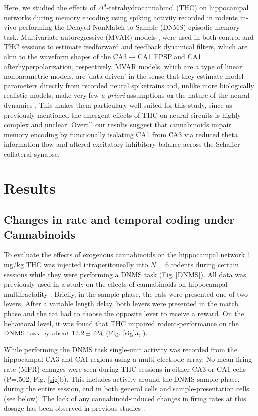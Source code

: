 \documentclass[11pt,a4paper,final]{article}
\begin{document}
Here, we studied the effects of $\Delta^9$-tetrahydrocannabinol (THC) on hippocampal networks during memory encoding using spiking activity recorded in rodents in-vivo performing the Delayed-NonMatch-to-Sample (DNMS) episodic memory task.
Multivariate autoregressive (MVAR) models \citep{sandler14}, were used in both control and THC sessions to estimate feedforward and feedback dynamical filters, which are akin to the waveform shapes of the CA3$\to$CA1 EPSP and CA1 afterhyperpolarization, respectively.
MVAR models, which are a type of linear nonparametric models, are 'data-driven' in the sense that they estimate model parameters directly from recorded neural spiketrains and, unlike more biologically realistic models, make very few \textit{a priori} assumptions on the nature of the neural dynamics \citep{marm04,song09par1}.
This makes them particulary well suited for this study, since as previously mentioned the emergent effects of THC on neural circuits is highly complex and unclear.
Overall our results suggest that cannabinoids impair memory encoding by functionally isolating CA1 from CA3 via reduced theta information flow and altered excitatory-inhibitory balance across the Schaffer collateral synapse.

\section{Results \label{results}}

    \subsection{Changes in rate and temporal coding under Cannabinoids}

To evaluate the effects of exogenous cannabinoids on the hippocampal network 1 mg/kg THC was injected intraperitoneally into $N=6$ rodents during certain sessions while they were performing a DNMS task (Fig. \ref{DNMS}).
All data was previously used in a study on the effects of cannabinoids on hippocampal multifractality \citep{dustin14,dustin15}.
Briefly, in the sample phase, the rats were presented one of two levers. 
After a variable length delay, both levers were presented in the match phase and the rat had to choose the opposite lever to receive a reward. 
On the behavioral level, it was found that THC impaired rodent-performance on the DNMS task by about $12.2\pm.6\%$ (Fig. \ref{sig}a, \citet{hampson00}).

While performing the DNMS task single-unit activity was recorded from the hippocampal CA3 and CA1 regions using a multi-electrode array.
No mean firing rate (MFR) changes were seen during THC sessions in either CA3 or CA1 cells (P=.502, Fig. \ref{sig}b).
This includes activity around the DNMS sample phase, during the entire session, and in both general cells and sample-presentation cells (see below).
The lack of any cannabinoid-induced changes in firing rates at this dosage has been observed in previous studies \citep{robbe06,goon10}.
\end{document}

